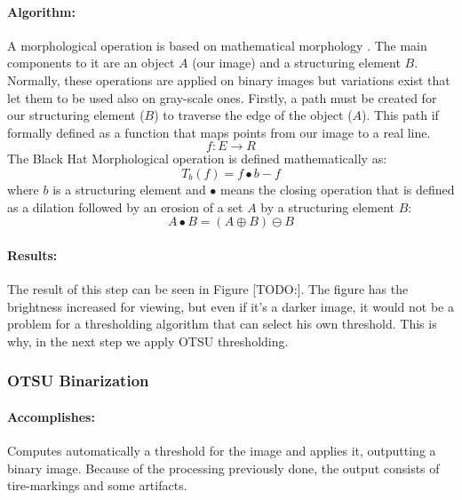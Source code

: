 \paragraph*{Algorithm:}\mbox{}\par
A morphological operation is based on mathematical morphology \cite{article:mathematical-morphology}. The main components to it are an object $A$ (our image) and a structuring element $B$. Normally, these operations are applied on binary images but variations exist that let them to be used also on gray-scale ones. Firstly, a path must be created for our structuring element ($B$) to traverse the edge of the object ($A$). This path if formally defined as a function that maps points from our image to a real line.
\[f:E \rightarrow R\]
The Black Hat Morphological operation is defined mathematically as:
\[T_b(f) = f \bullet b - f\]
where $b$ is a structuring element and $\bullet$ means the closing operation that is defined as a dilation followed by an erosion of a set $A$ by a structuring element $B$:
\[A \bullet B = (A \oplus B) \ominus B\]

\paragraph*{Results:}\mbox{}\par
The result of this step can be seen in Figure [TODO:]. The figure has the brightness increased for viewing, but even if it's a darker image, it would not be a problem for a thresholding algorithm that can select his own threshold. This is why, in the next step we apply OTSU thresholding.

\subsubsection{OTSU Binarization}
\label{subsubsec:OTSU-binarization}

\paragraph*{Accomplishes:}\mbox{}\par
Computes automatically a threshold for the image and applies it, outputting a binary image. Because of the processing previously done, the output consists of tire-markings and some artifacts.

